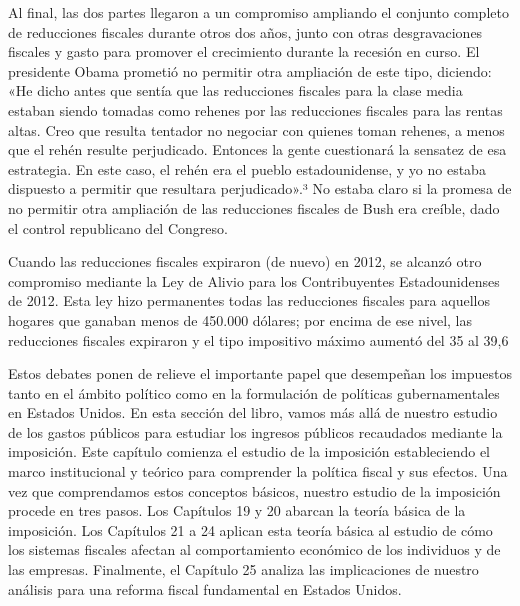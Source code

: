\documentclass[10pt,a4paper]{article}
\begin{document}
{Al final, las dos partes llegaron a un compromiso ampliando el conjunto completo de reducciones fiscales durante otros dos años, junto con otras desgravaciones fiscales y gasto para promover el crecimiento durante la recesión en curso. El presidente Obama prometió no permitir otra ampliación de este tipo, diciendo: «He dicho antes que sentía que las reducciones fiscales para la clase media estaban siendo tomadas como rehenes por las reducciones fiscales para las rentas altas. Creo que resulta tentador no negociar con quienes toman rehenes, a menos que el rehén resulte perjudicado. Entonces la gente cuestionará la sensatez de esa estrategia. En este caso, el rehén era el pueblo estadounidense, y yo no estaba dispuesto a permitir que resultara perjudicado».³ No estaba claro si la promesa de no permitir otra ampliación de las reducciones fiscales de Bush era creíble, dado el control republicano del Congreso.

Cuando las reducciones fiscales expiraron (de nuevo) en 2012, se alcanzó otro compromiso mediante la Ley de Alivio para los Contribuyentes Estadounidenses de 2012. Esta ley hizo permanentes todas las reducciones fiscales para aquellos hogares que ganaban menos de 450.000 dólares; por encima de ese nivel, las reducciones fiscales expiraron y el tipo impositivo máximo aumentó del 35 al 39,6 %

Estos debates ponen de relieve el importante papel que desempeñan los impuestos tanto en el ámbito político como en la formulación de políticas gubernamentales en Estados Unidos. En esta sección del libro, vamos más allá de nuestro estudio de los gastos públicos para estudiar los ingresos públicos recaudados mediante la imposición. Este capítulo comienza el estudio de la imposición estableciendo el marco institucional y teórico para comprender la política fiscal y sus efectos. Una vez que comprendamos estos conceptos básicos, nuestro estudio de la imposición procede en tres pasos. Los Capítulos 19 y 20 abarcan la teoría básica de la imposición. Los Capítulos 21 a 24 aplican esta teoría básica al estudio de cómo los sistemas fiscales afectan al comportamiento económico de los individuos y de las empresas. Finalmente, el Capítulo 25 analiza las implicaciones de nuestro análisis para una reforma fiscal fundamental en Estados Unidos.

}
\end{document}
